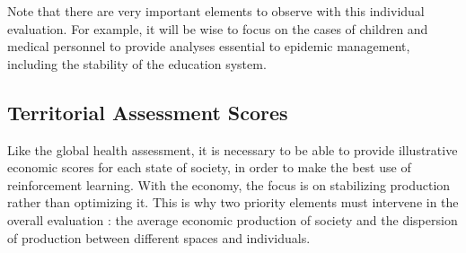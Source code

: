 Note that there are very important elements to observe with this individual evaluation. For example, it will be wise to focus on the cases of children and medical personnel to provide analyses essential to epidemic management, including the stability of the education system.\\

\subsection{Territorial Assessment Scores}

Like the global health assessment, it is necessary to be able to provide illustrative economic scores for each state of society, in order to make the best use of reinforcement learning. With the economy, the focus is on stabilizing production rather than optimizing it. This is why two priority elements must intervene in the overall evaluation : the average economic production of society and the dispersion of production between different spaces and individuals.